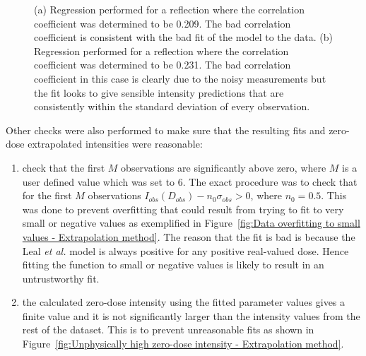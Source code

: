 \begin{figure}
\begin{subfigure}[b]{1\textwidth}
                \caption{}
                \label{fig:Bad correlation good fit - Extrapolation method}
        \end{subfigure}
        \caption{(a) Regression performed for a reflection where the correlation coefficient was determined to be 0.209.
        The bad correlation coefficient is consistent with the bad fit of the model to the data.
        (b) Regression performed for a reflection where the correlation coefficient was determined to be 0.231.
        The bad correlation coefficient in this case is clearly due to the noisy measurements but the fit looks to give sensible intensity predictions that are consistently within the standard deviation of every observation.}
        \label{fig:Bad correlation plots - Extrapolation method}
\end{figure}

Other checks were also performed to make sure that the resulting fits and zero-dose extrapolated intensities were reasonable:
\begin{enumerate}
    \item check that the first $M$ observations are significantly above zero, where $M$ is a user defined value which was set to 6.
    The exact procedure was to check that for the first $M$ observations $I_{obs}(D_{obs}) - n_0\sigma_{obs} > 0$, where $n_0 = 0.5$.
    This was done to prevent overfitting that could result from trying to fit to very small or negative values as exemplified in Figure~\ref{fig:Data overfitting to small values - Extrapolation method}.
    The reason that the fit is bad is because the Leal \textit{et al.} model is always positive for any positive real-valued dose.
    Hence fitting the function to small or negative values is likely to result in an untrustworthy fit.
    \item the calculated zero-dose intensity using the fitted parameter values gives a finite value and it is not significantly larger than the intensity values from the rest of the dataset.
    This is to prevent unreasonable fits as shown in Figure~\ref{fig:Unphysically high zero-dose intensity - Extrapolation method}.
\end{enumerate}

